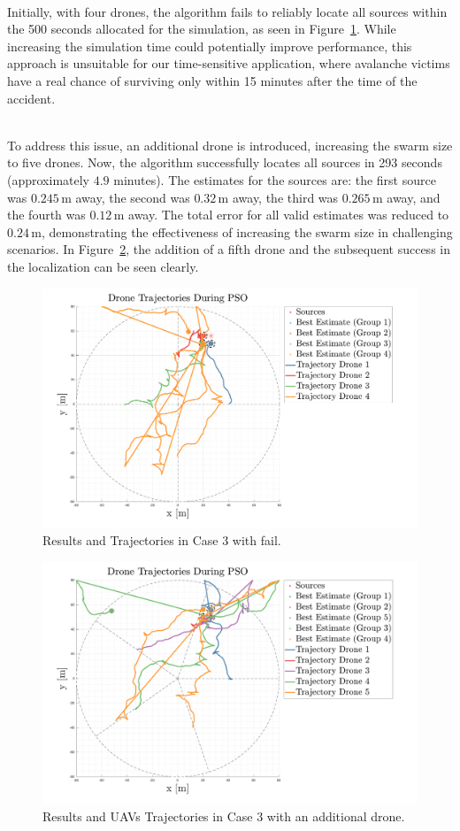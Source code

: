 \documentclass[main]{subfiles}
\begin{document}
\noindent\\
Initially, with four drones, the algorithm fails to reliably 
locate all sources within the 500 seconds allocated for the simulation,
as seen in Figure~\ref{fig:case3fail}. 
While increasing the simulation time could potentially improve performance, 
this approach is unsuitable for our time-sensitive application, where
avalanche victims have a real chance of surviving only within 15 minutes
after the time of the accident.

\noindent\\
To address this issue, an additional drone is introduced, increasing the 
swarm size to five drones. Now, the algorithm successfully 
locates all sources in 293 seconds (approximately \(4.9\) minutes). 
The estimates for the sources are: the first source was \(0.245 \, \text{m}\) away, 
the second was \(0.32 \, \text{m}\) away, the third was \(0.265 \, \text{m}\) away, and the 
fourth was \(0.12 \, \text{m}\) away. The total error for all valid estimates was 
reduced to \(0.24 \, \text{m}\), demonstrating the effectiveness of increasing the 
swarm size in challenging scenarios.
In Figure~\ref{fig:case3}, the addition of a fifth drone and the subsequent 
success in the localization can be seen clearly.

\begin{figure}
    \centering
    \includegraphics[width=1.06\textwidth]{images/case_3_fail.pdf}
    \caption[PSO Case 3]{Results and Trajectories in Case 3 with fail.}
    \label{fig:case3fail}
\end{figure}



\begin{figure}
    \centering
    \includegraphics[width=1.06\textwidth]{images/case_3.pdf}
    \caption[PSO Case 3]{Results and UAVs Trajectories in Case 3 with an additional drone.}
    \label{fig:case3}
\end{figure}
\end{document}
